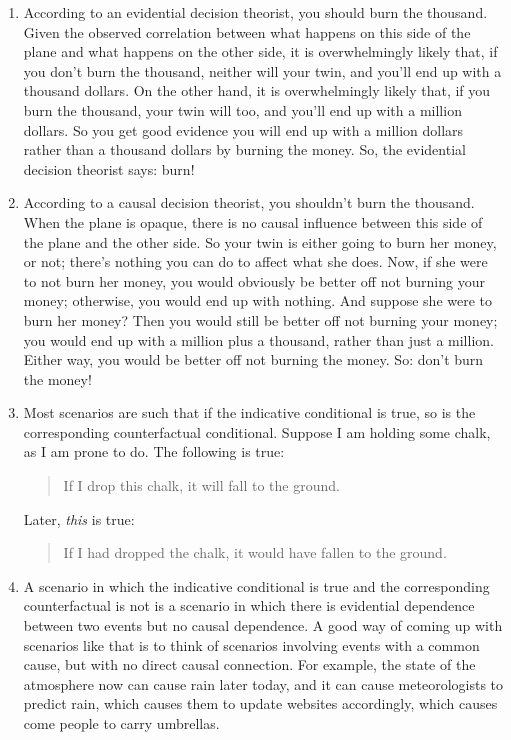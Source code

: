 \documentclass[12pt,a4paper]{article}
\begin{document}
\begin{enumerate}
  
  \item According to an evidential decision theorist, you should burn the thousand. Given the observed correlation between what happens on this side of the plane and what happens on the other side, it is overwhelmingly likely that, if you don't burn the thousand, neither will your twin, and you'll end up with a thousand dollars. On the other hand, it is overwhelmingly likely that, if you burn the thousand, your twin will too, and you'll end up with a million dollars. So you get good evidence you will end up with a million dollars rather than a thousand dollars by burning the money. So, the evidential decision theorist says: burn!
  
  \item According to a causal decision theorist, you shouldn't burn the thousand. When the plane is opaque, there is no causal influence between this side of the plane and the other side. So your twin is either going to burn her money, or not; there's nothing you can do to affect what she does. Now, if she were to not burn her money, you would obviously be better off not burning your money; otherwise, you would end up with nothing. And suppose she were to burn her money? Then you would still be better off not burning your money; you would end up with a million plus a thousand, rather than just a million. Either way, you would be better off not burning the money. So: don't burn the money!
 
 \item Most scenarios are such that if the indicative conditional is true, so is the corresponding counterfactual conditional. Suppose I am holding some chalk, as I am prone to do. The following is true:
 \begin{quote}
If I drop this chalk, it will fall to the ground.
\end{quote}

Later, \emph{this} is true:
\begin{quote}
If I had dropped the chalk, it would have fallen to the ground.
\end{quote}

\item A scenario in which the indicative conditional is true and the corresponding counterfactual is not is a scenario in which there is evidential dependence between two events but no causal dependence. A good way of coming up with scenarios like that is to think of scenarios involving events with a common cause, but with no direct causal connection. For example, the state of the atmosphere now can cause rain later today, and it can cause meteorologists to predict rain, which causes them to update websites accordingly, which causes come people to carry umbrellas.


\end{enumerate}
\end{document}
